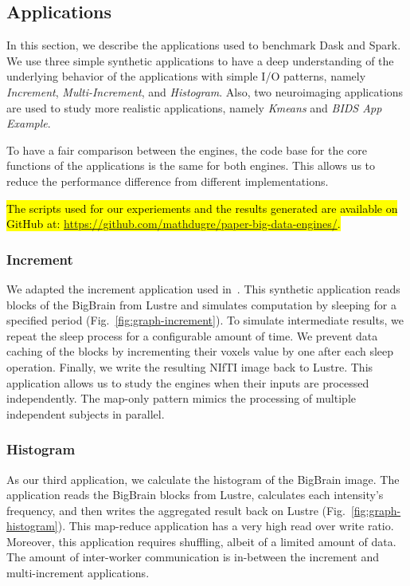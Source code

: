 \documentclass[AMA,STIX1COL]{WileyNJD-v2}
\newcommand{\HL}[1]{\hl{#1}}
\begin{document}
\subsection{Applications}
In this section, we describe the applications used to benchmark Dask and Spark.
We use three simple synthetic applications to have a deep understanding of the 
underlying behavior of the applications with simple I/O patterns, namely
\textit{Increment}, \textit{Multi-Increment}, and \textit{Histogram}.
Also, two neuroimaging applications are used to study more realistic 
applications, namely \textit{Kmeans} and \textit{BIDS App Example}\HL{{\cite{gorgolewski2017bids}}}.
				
To have a fair comparison between the engines, the code base for the core functions of the applications is the same for both engines.
This allows us to reduce the performance difference from different implementations.
		
\HL{The scripts used for our experiements and the results generated are available on
	GitHub at: \mbox{\href{https://github.com/mathdugre/paper-big-data-engines}{https://github.com/mathdugre/paper-big-data-engines/}}.}
		
\subsubsection{Increment}
We adapted the increment application used in~\cite{8752675}.
This synthetic application reads blocks of the BigBrain from Lustre and
simulates computation by sleeping for a specified period (Fig.~\ref{fig:graph-increment}). To simulate
intermediate results, we repeat the sleep process for a configurable amount
of time. We prevent data caching of the blocks by incrementing their voxels
value by one after each sleep operation. Finally, we write the resulting
NIfTI image back to Lustre. This application allows us to study the engines
when their inputs are processed independently. The map-only pattern
mimics the processing of multiple independent subjects in parallel.
					
\subsubsection{Histogram}
As our third application, we calculate the histogram of the BigBrain image. 
The application reads the BigBrain blocks from Lustre, calculates each intensity's frequency, and then writes the aggregated result back on Lustre (Fig.~\ref{fig:graph-histogram}).
This map-reduce application has a very high read over write ratio.
Moreover, this application requires shuffling, albeit of a limited amount of data. 
The amount of inter-worker communication is in-between the increment and multi-increment applications.
		
\end{document}
